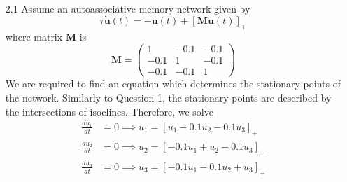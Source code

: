 \documentclass[12pt]{article}
\begin{document}
\begin{enumerate}
\item[2.1] Assume an autoassociative memory network given by
\[
    \tau \mathbf{\dot u}(t) = -\mathbf{u}(t) + [\mathbf{Mu}(t)]_{+}
\]  
where matrix $\mathbf{M}$ is 
\[
\mathbf{M}=\begin{pmatrix}1 & -0.1 & -0.1\\ -0.1 & 1 & -0.1\\ -0.1 & -0.1 & 1\end{pmatrix}  
\]
We are required to find an equation which determines the stationary points of the network. Similarly to Question 1, 
the stationary points are described by the intersections of isoclines. Therefore, we solve
\begin{align*}
    \frac{du_{1}}{dt} &= 0 \implies u_{1}=[u_{1} -0.1u_{2}-0.1u_{3}]_{+}\\
    \frac{du_{2}}{dt} &= 0 \implies u_{2}=[-0.1u_{1} +u_{2}-0.1u_{3}]_{+}\\
    \frac{du_{3}}{dt} &= 0 \implies u_{3}=[-0.1u_{1} -0.1u_{2}+u_{3}]_{+}
\end{align*}
\end{enumerate}
\end{document}
